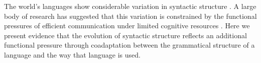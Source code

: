 \documentclass[11pt,a4paper]{article}
\newcommand\comment[1]{{\color{red}#1}}
\begin{document}









The world's languages show considerable variation in syntactic structure \citep{greenberg-universals-1963, baker2001atoms, croft2003typology}. A large body of research has suggested that this variation is constrained by the functional pressures of efficient communication under limited cognitive resources \citep{haspelmath2008parametric, jaeger2011on, kemp2018semantic, gibson2019how}. Here we present evidence that the evolution of syntactic structure reflects an additional functional pressure through coadaptation between the grammatical structure of a language and the way that language is used.




\end{document}
